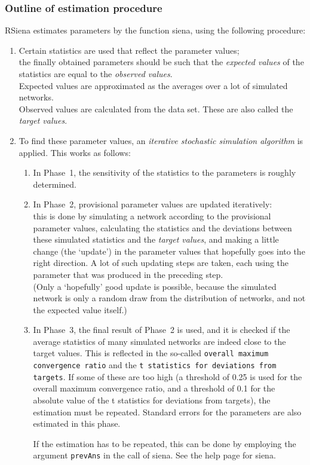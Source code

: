 \documentclass[a4paper,fleqn,11pt]{article}
\newcommand{\+}{\, + \,}
\newcommand{\sfn}[1]{\textsf{#1}}
\newcommand{\RS}{{\sf \textsf{RSiena} }}
\begin{document}
\subsubsection{Outline of estimation procedure}
\label{S_estim}
\noindent
\RS estimates parameters by the function \sfn{siena},
using the following procedure:
\begin{enumerate}
\item  Certain statistics are used that reflect the parameter values;\\
  the finally obtained parameters should be such that the \emph{expected
    values}
  of the statistics are equal to the \emph{observed values}.\\
  Expected values are approximated as the averages over a lot of simulated
  networks.\\
  Observed values are calculated from the data set. These are also called the
  \emph{target values}.
\item To find these parameter values, an \emph{iterative stochastic simulation
    algorithm}
  is applied.
  This works as follows:
\begin{enumerate}
\item In Phase~1, the sensitivity of the statistics to the parameters is roughly
  determined.
\item In Phase~2, provisional parameter values are updated iteratively:\\
  this is done by simulating a network according to the provisional parameter
  values, calculating the statistics and the deviations between these simulated
  statistics and the \emph{target values}, and making a little change (the
  `update') in the parameter values
  that hopefully goes into the right direction. A lot of such updating steps
  are taken, each using the parameter that was produced in the preceding step.\\
  (Only a `hopefully' good update is possible, because the simulated network is
  only a random draw from the distribution of networks, and not the expected
  value itself.)
\item In Phase~3, the final result of Phase~2 is used, and it is checked if the
  average statistics of many simulated networks are indeed close to the target
  values. This is reflected in the so-called
  \texttt{overall maximum convergence ratio} and the \texttt{t statistics for deviations
  from targets}. If some of these are too high (a threshold of 0.25 is used for the
  overall maximum convergence ratio, and a threshold of 0.1 for the absolute value
  of the t statistics for deviations from targets), the estimation must be repeated.
   Standard errors for the parameters are also estimated in this
  phase.

  If the estimation has to be repeated, this can be done by employing the
  argument \texttt{prevAns} in the call of \sfn{siena}.
  See the help page for  \sfn{siena}.
\end{enumerate}
\end{enumerate}
\end{document}
